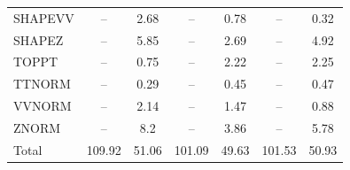 \begin{table}[H]
\begin{center}
\begin{footnotesize}
\begin{tabular}{lcccccc}
				SHAPEVV & -- &  2.68 & -- &  0.78 & -- &  0.32 \\
				SHAPEZ & -- &  5.85 & -- &  2.69 & -- &  4.92 \\
				TOPPT & -- &  0.75 & -- &  2.22 & -- &  2.25 \\
				TTNORM & -- &  0.29 & -- &  0.45 & -- &  0.47 \\
				VVNORM & -- &  2.14 & -- &  1.47 & -- &  0.88 \\
				ZNORM & -- &  8.2 & -- &  3.86 & -- &  5.78 \\
				Total &  109.92  &  51.06 &  101.09  &  49.63 &  101.53  &  50.93 \\ \hline \hline
			\end{tabular}
			\label{tab:SysUncertainties_2900}
        \end{footnotesize}
	\end{center}
\end{table}


